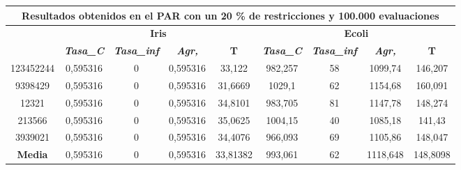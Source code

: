 \documentclass[12pt, spanish]{article}
\begin{document}
\begin{table}[H]
\begin{tabular}{|c|c|c|c|c|c|c|c|c|}
\hline
\multicolumn{9}{|c|}{\textbf{Resultados obtenidos en el PAR con un 20 \% de restricciones y 100.000 evaluaciones}}                                                                                                \\ \hline
\multirow{2}{*}{} & \multicolumn{4}{c|}{\textbf{Iris}}                                                            & \multicolumn{4}{c|}{\textbf{Ecoli}}                                                           \\ \cline{2-9} 
                  & \textit{\textbf{Tasa\_C}} & \textit{\textbf{Tasa\_inf}} & \textit{\textbf{Agr,}} & \textbf{T} & \textit{\textbf{Tasa\_C}} & \textit{\textbf{Tasa\_inf}} & \textit{\textbf{Agr,}} & \textbf{T} \\ \hline
123452244         & 0,595316                  & 0                           & 0,595316               & 33,122     & 982,257                   & 58                          & 1099,74                & 146,207    \\ \hline
9398429           & 0,595316                  & 0                           & 0,595316               & 31,6669    & 1029,1                    & 62                          & 1154,68                & 160,091    \\ \hline
12321             & 0,595316                  & 0                           & 0,595316               & 34,8101    & 983,705                   & 81                          & 1147,78                & 148,274    \\ \hline
213566            & 0,595316                  & 0                           & 0,595316               & 35,0625    & 1004,15                   & 40                          & 1085,18                & 141,43     \\ \hline
3939021           & 0,595316                  & 0                           & 0,595316               & 34,4076    & 966,093                   & 69                          & 1105,86                & 148,047    \\ \hline
\textbf{Media}    & 0,595316                  & 0                           & 0,595316               & 33,81382   & 993,061                   & 62                          & 1118,648               & 148,8098   \\ \hline
\end{tabular}
\end{table}
\end{document}
